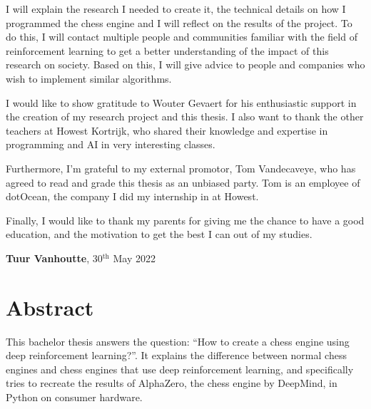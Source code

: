 \documentclass{article}
\begin{document}
I will explain the research I needed to create it, the technical details on how I programmed the
chess engine and I will reflect on the results of the project. To do this, I will contact 
multiple people and communities familiar with the field of reinforcement learning to get a better understanding of the
impact of this research on society. Based on this, I will give advice to people and companies who 
wish to implement similar algorithms.

I would like to show gratitude to Wouter Gevaert for his enthusiastic support in the creation of my research project 
and this thesis. I also want to thank the other teachers at Howest Kortrijk, who shared their knowledge
and expertise in programming and AI in very interesting classes.

Furthermore, I'm grateful to my external promotor, Tom Vandecaveye, who has agreed to read and grade
this thesis as an unbiased party. Tom is an employee of dotOcean, the company I did my
internship in at Howest.

Finally, I would like to thank my parents for giving me the chance to have a good education, and 
the motivation to get the best I can out of my studies.

\vspace{3em}

\begin{center}
    \textbf{Tuur Vanhoutte}, 30$^{\text{th}}$ May 2022
\end{center}

\newpage
\thispagestyle{empty}
\mbox{}
\newpage

\section*{Abstract}



This bachelor thesis answers the question: ``How to create a chess engine using deep reinforcement learning?''.
It explains the difference between normal chess engines and chess engines that use deep reinforcement learning, and
specifically tries to recreate the results of AlphaZero, the chess engine by DeepMind, in Python on consumer hardware. 
\end{document}
